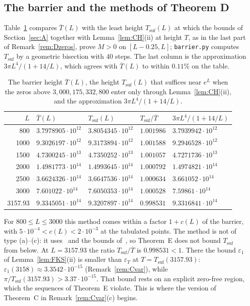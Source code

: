 \documentclass{amsart}
\theoremstyle{definition}
\theoremstyle{remark}
\theoremstyle{plain}
\numberwithin{equation}{section}
\newcommand{\eps}{\varepsilon}
\newcommand{\HRH}{3{,}000{,}175{,}332{,}800}
\newcommand{\Tb}{\overline{T}}
\newcommand{\Tsuf}{T_{\mathrm{suf}}}
\begin{document}
\subsection{The barrier and the methods of Theorem D}
Table~\ref{tab:barrier} compares $\Tb(L)$ with the least height $\Tsuf(L)$ at which the bounds of Section~\ref{sec:A} together with Lemma~\ref{lem:CH}(ii) at height $T$, as in the last part of Remark~\ref{rem:Dzeros}, prove $M>0$ on $[L-0.25,L]$; \texttt{barrier.py} computes $\Tsuf$ by a geometric bisection with $40$ steps. The last column is the approximation $3\pi L^4/(1+14/L)$, which agrees with $\Tb(L)$ to within $0.11\%$ on the table.

\begin{table}[ht]
\caption{The barrier height $\Tb(L)$, the height $\Tsuf(L)$ that suffices near $e^L$ when the zeros above $\HRH$ enter only through Lemma~\ref{lem:CH}(ii), and the approximation $3\pi L^4/(1+14/L)$.}\label{tab:barrier}
\small
\begin{tabular}{rllll}
\toprule
$L$ & $\Tb(L)$ & $\Tsuf(L)$ & $\Tsuf/\Tb$ & $3\pi L^4/(1+14/L)$\\
\midrule
800     & $3.7978905\cdot10^{12}$ & $3.8054345\cdot10^{12}$ & $1.001986$ & $3.7939942\cdot10^{12}$\\
1000    & $9.3026197\cdot10^{12}$ & $9.3173894\cdot10^{12}$ & $1.001588$ & $9.2946528\cdot10^{12}$\\
1500    & $4.7300245\cdot10^{13}$ & $4.7350252\cdot10^{13}$ & $1.001057$ & $4.7271736\cdot10^{13}$\\
2000    & $1.4981773\cdot10^{14}$ & $1.4993645\cdot10^{14}$ & $1.000792$ & $1.4974821\cdot10^{14}$\\
2500    & $3.6624326\cdot10^{14}$ & $3.6647536\cdot10^{14}$ & $1.000634$ & $3.661052\cdot10^{14}$\\
3000    & $7.601022\cdot10^{14}$  & $7.6050353\cdot10^{14}$ & $1.000528$ & $7.59861\cdot10^{14}$\\
3157.93 & $9.3345051\cdot10^{14}$ & $9.3207897\cdot10^{14}$ & $0.998531$ & $9.3316841\cdot10^{14}$\\
\bottomrule
\end{tabular}
\end{table}

For $800\le L\le3000$ this method comes within a factor $1+c(L)$ of the barrier, with $5\cdot10^{-4}<c(L)<2\cdot10^{-3}$ at the tabulated points. The method is not of type (a)--(c): it uses~\cite[Prop.~9.1]{CH25} and the bounds of~\cite{FKS23}, so Theorem~E does not bound $\Tsuf$ from below. At $L=3157.93$ the ratio $\Tsuf/\Tb$ is $0.998531<1$. There the bound $\eps_1$ of Lemma~\ref{lem:FKS}(ii) is smaller than $\eps_T$ at $T=\Tsuf(3157.93)$: $\eps_1(3158)\approx3.3542\cdot10^{-15}$ (Remark~\ref{rem:Cvar}), while $\pi/\Tsuf(3157.93)>3.37\cdot10^{-15}$. That bound rests on an explicit zero-free region, which the sequences of Theorem~E violate. This is where the version of Theorem~C in Remark~\ref{rem:Cvar}(c) begins.
\end{document}
